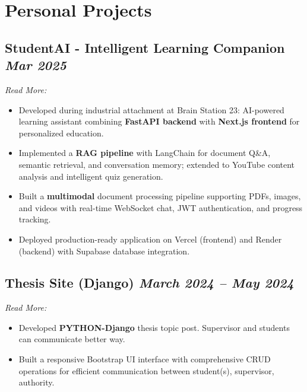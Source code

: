 \documentclass[10pt, a4paper]{article}
\newcommand{\datedsubsection}[2]{%
  \subsection*{#1 \hfill \small\textit{#2}}%
}
\newcommand{\resitem}[1]{\item #1} %
\begin{document}
\section{Personal Projects}
\datedsubsection{StudentAI - Intelligent Learning Companion}{Mar 2025}
\textit{Read More:} \href{https://www.mehedi-hasan-maruf.me/projects/student-ai}{\faExternalLink*}
\begin{itemize}
    \resitem{Developed during industrial attachment at Brain Station 23: AI-powered learning assistant combining \textbf{FastAPI backend} with \textbf{Next.js frontend} for personalized education.}
    \resitem{Implemented a \textbf{RAG pipeline} with LangChain for document Q\&A, semantic retrieval, and conversation memory; extended to YouTube content analysis and intelligent quiz generation.}
    \resitem{Built a \textbf{multimodal} document processing pipeline supporting PDFs, images, and videos with real-time WebSocket chat, JWT authentication, and progress tracking.}
    \resitem{Deployed production-ready application on Vercel (frontend) and Render (backend) with Supabase database integration.}
\end{itemize}

\datedsubsection{Thesis Site (Django)}{March 2024 -- May 2024}
\textit{Read More:} \href{https://www.mehedi-hasan-maruf.me/projects/thesis-website-django}{\faExternalLink*}
\begin{itemize}
    \resitem{Developed \textbf{PYTHON-Django} thesis topic post. Supervisor and students can communicate better way.}
    \resitem{Built a responsive Bootstrap UI interface with comprehensive CRUD operations for efficient communication between student(s), supervisor, authority.}
\end{itemize}


\end{document}
